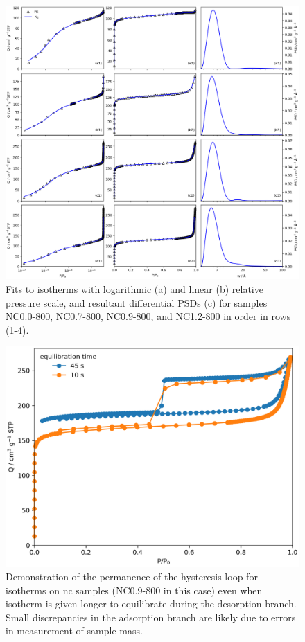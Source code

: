 \begin{subappendices}
\begin{figure}[p]
    \centering
    \includegraphics[width=\columnwidth, keepaspectratio]{4-impregnation/figs/NCxx-800_isopsd.png}
    \caption{Fits to  isotherms with logarithmic (a) and linear (b) relative pressure scale, and resultant differential PSDs (c) for samples NC0.0-800, NC0.7-800, NC0.9-800, and NC1.2-800 in order in rows (1-4).}
    \label{fig:NCxx-800_psdisofull}
\end{figure}

\begin{figure}[p]
    \centering
    \includegraphics[width=\columnwidth, keepaspectratio]{4-impregnation/figs/hyst.png}
    \caption{Demonstration of the permanence of the hysteresis loop for  isotherms on \acrshort{nc} samples (NC0.9-800 in this case) even when isotherm is given longer to equilibrate during the desorption branch. Small discrepancies in the adsorption branch are likely due to errors in measurement of sample mass.}
    \label{fig:hyst}
\end{figure}

\end{subappendices}